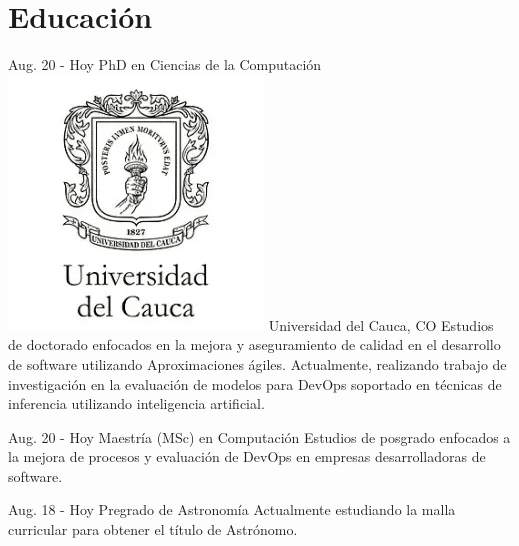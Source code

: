 \documentclass[]{cv-class}
\begin{document}
\section{Educación}
\begin{entrylist}
	\entry
	{Aug. 20 - Hoy}
	{PhD en Ciencias de la Computación}
	{{\includegraphics[scale=0.05]{img/unicauca-logo.png}} Universidad del Cauca, CO} 
	{\justifying Estudios de doctorado enfocados en la mejora y aseguramiento de calidad en el desarrollo de software utilizando Aproximaciones ágiles. Actualmente, realizando trabajo de investigación en la evaluación de modelos para DevOps soportado en técnicas de inferencia utilizando inteligencia artificial.}
	
	\entry
	{Aug. 20 - Hoy}
	{Maestría (MSc) en Computación}
	{}
	{\justifying Estudios de posgrado enfocados a la mejora de procesos y evaluación de DevOps en empresas desarrolladoras de software.}
	
	\entry
	{Aug. 18 - Hoy}
	{Pregrado de Astronomía}
	{}
	{\justifying Actualmente estudiando la malla curricular para obtener el título de Astrónomo.}
	

\end{entrylist}
\end{document}

